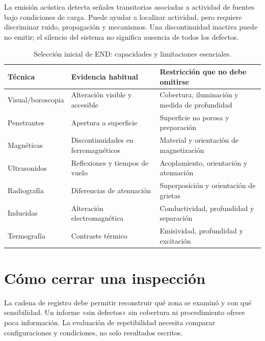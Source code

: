 La emisión acústica detecta señales transitorias asociadas a actividad de fuentes bajo condiciones de carga. Puede ayudar a localizar actividad, pero requiere discriminar ruido, propagación y mecanismos. Una discontinuidad inactiva puede no emitir; el silencio del sistema no significa ausencia de todos los defectos.
\begin{table}[htbp]\centering\small\caption{Selección inicial de END: capacidades y limitaciones esenciales.}\label{tab:end}
\begin{tabular}{p{.18\linewidth}p{.32\linewidth}p{.38\linewidth}}\toprule
Técnica & Evidencia habitual & Restricción que no debe omitirse\\\midrule
Visual/boroscopia & Alteración visible y accesible & Cobertura, iluminación y medida de profundidad\\[3pt]
Penetrantes & Apertura a superficie & Superficie no porosa y preparación\\[3pt]
Magnéticas & Discontinuidades en ferromagnéticos & Material y orientación de magnetización\\[3pt]
Ultrasonidos & Reflexiones y tiempos de vuelo & Acoplamiento, orientación y atenuación\\[3pt]
Radiografía & Diferencias de atenuación & Superposición y orientación de grietas\\[3pt]
Inducidas & Alteración electromagnética & Conductividad, profundidad y separación\\[3pt]
Termografía & Contraste térmico & Emisividad, profundidad y excitación\\\bottomrule
\end{tabular}\end{table}
\section{Cómo cerrar una inspección}
La cadena de registro debe permitir reconstruir qué zona se examinó y con qué sensibilidad. Un informe «sin defectos» sin cobertura ni procedimiento ofrece poca información. La evaluación de repetibilidad necesita comparar configuraciones y condiciones, no solo resultados escritos.

